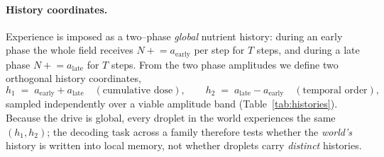 \documentclass[11pt]{article}
\begin{document}
\paragraph{History coordinates.} Experience is imposed as a two--phase \emph{global} nutrient history: during an
early phase the whole field receives $N\mathrel{+}=a_{\mathrm{early}}$ per step for $T$ steps, and during a late
phase $N\mathrel{+}=a_{\mathrm{late}}$ for $T$ steps. From the two phase amplitudes we define two orthogonal history
coordinates,
\begin{equation}
h_1 \;=\; a_{\mathrm{early}}+a_{\mathrm{late}} \quad(\text{cumulative dose}), \qquad
h_2 \;=\; a_{\mathrm{late}}-a_{\mathrm{early}} \quad(\text{temporal order}),
\label{eq:coords}
\end{equation}
sampled independently over a viable amplitude band (Table~\ref{tab:histories}). Because the drive is global, every
droplet in the world experiences the same $(h_1,h_2)$; the decoding task across a family therefore tests whether the
\emph{world's} history is written into local memory, not whether droplets carry \emph{distinct} histories.
\end{document}
